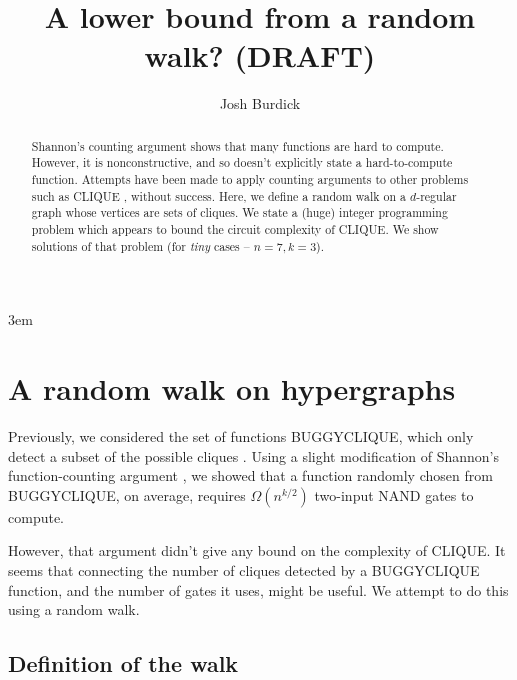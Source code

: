\documentclass[12pt]{article}
\theoremstyle{definition}
\begin{document}
\emergencystretch 3em
\title{A lower bound from a random walk? (DRAFT)}

\author{Josh Burdick}

\maketitle

\begin{abstract}

Shannon's counting argument \cite{shannon_synthesis_1949} shows that many functions are hard to compute.
However, it is nonconstructive, and so doesn't explicitly state a
hard-to-compute function. Attempts have been made to apply counting arguments to other problems
such as CLIQUE \cite{buggyclique}, without success.
Here, we define a random walk on a $d$-regular graph whose vertices are
sets of cliques. We state a (huge) integer programming
problem which appears to bound the circuit complexity of CLIQUE. We show solutions
of that problem (for {\em tiny} cases -- $n=7, k=3$).

\end{abstract}

\newpage

\tableofcontents

\vspace{5mm}


\section{A random walk on hypergraphs} \label{se:countingBound}

Previously, we considered the set of functions BUGGYCLIQUE, which
only detect a subset of the possible cliques \cite{buggyclique}.
Using a slight modification of Shannon's
function-counting argument \cite{shannon_synthesis_1949},
we showed that a function randomly chosen from BUGGYCLIQUE,
on average, requires $\Omega(n^{k/2})$ two-input NAND gates to compute.

However, that argument didn't give any bound on the complexity of CLIQUE.
It seems that connecting the number of cliques detected by a BUGGYCLIQUE
function, and the number of gates it uses, might be useful. We attempt
to do this using a random walk.

\subsection{Definition of the walk}
\end{document}
